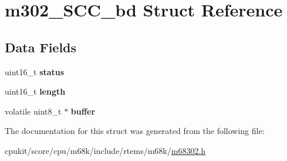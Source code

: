\hypertarget{structm302__SCC__bd}{}\section{m302\+\_\+\+S\+C\+C\+\_\+bd Struct Reference}
\label{structm302__SCC__bd}
\subsection*{Data Fields}
\begin{DoxyCompactItemize}
\item 
\mbox{\label{structm302__SCC__bd_a6516745b4189971ffb7f7c78efaaad9c}} 
uint16\+\_\+t {\bfseries status}
\item 
\mbox{\label{structm302__SCC__bd_a0720137ef76c861bbbc09c0eca0ebd7b}} 
uint16\+\_\+t {\bfseries length}
\item 
\mbox{\label{structm302__SCC__bd_a64957ca4396432d0a4b2072d4bb85d5b}} 
volatile uint8\+\_\+t $\ast$ {\bfseries buffer}
\end{DoxyCompactItemize}


The documentation for this struct was generated from the following file\+:\begin{DoxyCompactItemize}
\item 
cpukit/score/cpu/m68k/include/rtems/m68k/\mbox{\hyperlink{m68302_8h}{m68302.\+h}}\end{DoxyCompactItemize}
